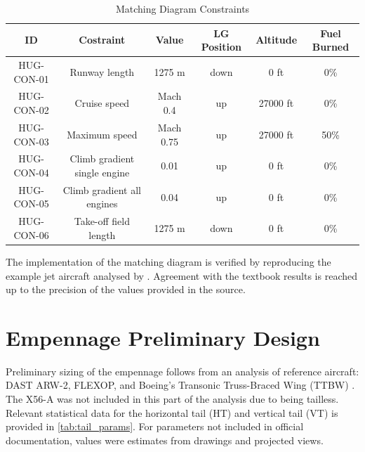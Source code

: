 \begin{table}[h]
\centering
\caption{Matching Diagram Constraints}
\label{tab: Matching diagram constraints}
\begin{tabular}
{|c|c|c|c|c|c|}
    \hline
    \textbf{ID} & \textbf{Costraint} & \textbf{Value} & \textbf{LG Position} & \textbf{Altitude} & \textbf{Fuel Burned} \\
    \hline\hline
    HUG-CON-01 & Runway length & 1275 m& down & 0 ft & 0\% \\
    \hline
    HUG-CON-02 & Cruise speed & Mach 0.4 & up & 27000 ft & 0\% \\
    \hline
    HUG-CON-03 & Maximum speed & Mach 0.75 & up & 27000 ft & 50\% \\
    \hline
    HUG-CON-04 & Climb gradient single engine & 0.01 & up & 0 ft & 0\% \\
    \hline
    HUG-CON-05 & Climb gradient all engines & 0.04 & up & 0 ft& 0\% \\
    \hline
    HUG-CON-06 & Take-off field length & 1275 m & down & 0 ft & 0\% \\
    \hline
    \end{tabular}
\end{table}

The implementation of the matching diagram is verified by reproducing the example jet aircraft analysed by \cite{Vos}. Agreement with the textbook results is reached up to the precision of the values provided in the source.




\section{Empennage Preliminary Design}
\label{sec:empennage_preliminary_design}
Preliminary sizing of the empennage follows from an analysis of reference aircraft: DAST ARW-2, FLEXOP, and Boeing's Transonic Truss-Braced Wing (TTBW) \cite{XiongBoeing}. The X56-A was not included in this part of the analysis due to being tailless. Relevant statistical data for the horizontal tail (HT) and vertical tail (VT) is provided in \autoref{tab:tail_params}. For parameters not included in official documentation, values were estimates from drawings and projected views.

